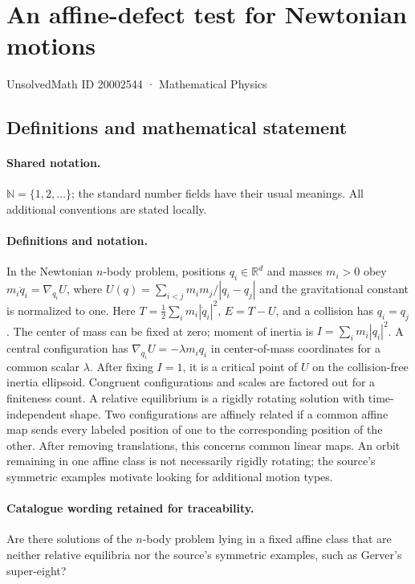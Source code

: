 \documentclass[11pt]{article}
\begin{document}
\setcounter{section}{20002543}
\section{An affine-defect test for Newtonian motions}\label{20002544}
{\small UnsolvedMath ID 20002544 · Mathematical Physics}
\subsection{Definitions and mathematical statement}

\paragraph{Shared notation.}$\mathbb N=\{1,2,\ldots\}$; the standard number fields have their usual meanings. All additional conventions are stated locally.


\paragraph{Definitions and notation.}In the Newtonian $n$-body problem, positions $q_i\in\mathbb R^d$ and masses $m_i>0$ obey $m_i\ddot q_i=\nabla_{q_i}U$, where $U(q)=\sum_{i<j}m_im_j/|q_i-q_j|$ and the gravitational constant is normalized to one. Here $T=\tfrac12\sum_i m_i|\dot q_i|^2$, $E=T-U$, and a collision has $q_i=q_j$. The center of mass can be fixed at zero; moment of inertia is $I=\sum_i m_i|q_i|^2$. A central configuration has $\nabla_{q_i}U=-\lambda m_iq_i$ in center-of-mass coordinates for a common scalar $\lambda$. After fixing $I=1$, it is a critical point of $U$ on the collision-free inertia ellipsoid. Congruent configurations and scales are factored out for a finiteness count. A relative equilibrium is a rigidly rotating solution with time-independent shape. Two configurations are affinely related if a common affine map sends every labeled position of one to the corresponding position of the other. After removing translations, this concerns common linear maps. An orbit remaining in one affine class is not necessarily rigidly rotating; the source’s symmetric examples motivate looking for additional motion types.

\paragraph{Catalogue wording retained for traceability.}
Are there solutions of the $n$-body problem lying in a fixed affine class that are neither relative equilibria nor the source’s symmetric examples, such as Gerver’s super-eight?
\end{document}

